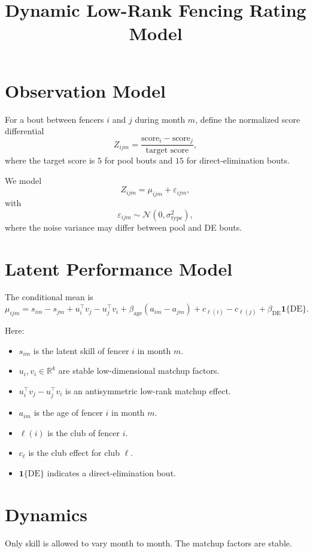 \documentclass[11pt]{article}
\title{Dynamic Low-Rank Fencing Rating Model}
\date{}
\begin{document}
\maketitle

\section{Observation Model}

For a bout between fencers $i$ and $j$ during month $m$, define the normalized score differential
\[
Z_{ijm}
=
\frac{\text{score}_i-\text{score}_j}{\text{target score}},
\]
where the target score is $5$ for pool bouts and $15$ for direct-elimination bouts.

We model
\[
Z_{ijm}
=
\mu_{ijm}+\varepsilon_{ijm},
\]
with
\[
\varepsilon_{ijm}\sim \mathcal N(0,\sigma^2_{\mathrm{type}}),
\]
where the noise variance may differ between pool and DE bouts.

\section{Latent Performance Model}

The conditional mean is
\[
\boxed{
\mu_{ijm}
=
s_{im}-s_{jm}
+
u_i^\top v_j-u_j^\top v_i
+
\beta_{\mathrm{age}}(a_{im}-a_{jm})
+
c_{\ell(i)}-c_{\ell(j)}
+
\beta_{\mathrm{DE}}\mathbf 1\{\mathrm{DE}\}.
}
\]

Here:
\begin{itemize}
    \item $s_{im}$ is the latent skill of fencer $i$ in month $m$.
    \item $u_i,v_i\in\mathbb R^k$ are stable low-dimensional matchup factors.
    \item $u_i^\top v_j-u_j^\top v_i$ is an antisymmetric low-rank matchup effect.
    \item $a_{im}$ is the age of fencer $i$ in month $m$.
    \item $\ell(i)$ is the club of fencer $i$.
    \item $c_{\ell}$ is the club effect for club $\ell$.
    \item $\mathbf 1\{\mathrm{DE}\}$ indicates a direct-elimination bout.
\end{itemize}

\section{Dynamics}

Only skill is allowed to vary month to month. The matchup factors are stable.
\end{document}
